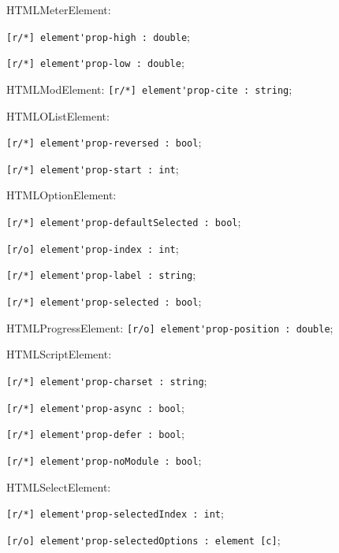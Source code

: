 \begin{icItems}
	\item HTMLMeterElement:
	\begin{icItems}
		\item \lstinline|[r/*] element'prop-high : double|;
		\item \lstinline|[r/*] element'prop-low : double|;
	\end{icItems}
	
	\item HTMLModElement: \lstinline|[r/*] element'prop-cite : string|;
	
	\item HTMLOListElement:
	\begin{icItems}
		\item \lstinline|[r/*] element'prop-reversed : bool|;
		\item \lstinline|[r/*] element'prop-start : int|;
	\end{icItems}
	
	\item HTMLOptionElement:
	\begin{icItems}
		\item \lstinline|[r/*] element'prop-defaultSelected : bool|;
		\item \lstinline|[r/o] element'prop-index : int|;
		\item \lstinline|[r/*] element'prop-label : string|;
		\item \lstinline|[r/*] element'prop-selected : bool|;
	\end{icItems}
	
	\item HTMLProgressElement: \lstinline|[r/o] element'prop-position : double|;
	
	\item HTMLScriptElement:
	\begin{icItems}
		\item \lstinline|[r/*] element'prop-charset : string|;
		\item \lstinline|[r/*] element'prop-async : bool|;
		\item \lstinline|[r/*] element'prop-defer : bool|;
		\item \lstinline|[r/*] element'prop-noModule : bool|;
	\end{icItems}
	
	\item HTMLSelectElement:
	\begin{icItems}
		\item \lstinline|[r/*] element'prop-selectedIndex : int|;
		\item \lstinline|[r/o] element'prop-selectedOptions : element [c]|;
	\end{icItems}
	

\end{icItems}
